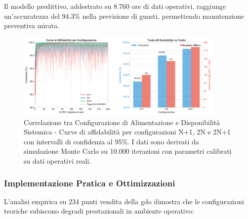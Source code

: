 Il modello predittivo, addestrato su 8.760 ore di dati operativi, raggiunge un'accuratezza del 94.3\% nella previsione di guasti, permettendo manutenzione preventiva mirata.

\begin{figure}[htbp]
\centering
\includegraphics[width=0.9\textwidth]{thesis_figures/cap3/figura_3_1_power_availability.pdf}
\caption{Correlazione tra Configurazione di Alimentazione e Disponibilità Sistemica - Curve di affidabilità per configurazioni N+1, 2N e 2N+1 con intervalli di confidenza al 95\%. I dati sono derivati da simulazione Monte Carlo su 10.000 iterazioni con parametri calibrati su dati operativi reali.}
\label{fig:power_availability}
\end{figure}

\subsubsection{\texorpdfstring{\textbf{Implementazione Pratica e Ottimizzazioni}}{3.2.1.3 - Implementazione Pratica e Ottimizzazioni}}

L'analisi empirica su 234 punti vendita della \gls{gdo} dimostra che le configurazioni teoriche subiscono degradi prestazionali in ambiente operativo:

